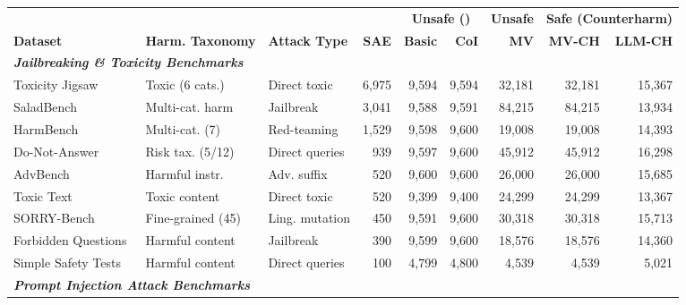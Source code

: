 \begin{table}[t]
\centering
\scriptsize
\setlength{\tabcolsep}{2.5pt}
\begin{tabular}{lll r rr r rr}
\toprule
 & & & & \multicolumn{2}{c}{\textbf{Unsafe (\dllm{})}} & \textbf{Unsafe} & \multicolumn{2}{c}{\textbf{Safe (Counterharm)}} \\
\cmidrule(lr){5-6}\cmidrule(lr){8-9}
\textbf{Dataset} & \textbf{Harm. Taxonomy} & \textbf{Attack Type} & \textbf{SAE} & \textbf{Basic} & \textbf{CoI} & \textbf{MV} & \textbf{MV-CH} & \textbf{LLM-CH} \\
\midrule
\multicolumn{9}{l}{\textbf{\textit{Jailbreaking \& Toxicity Benchmarks}}} \\
Toxicity Jigsaw~\cite{jigsaw2018toxic}                  & Toxic (6 cats.)      & Direct toxic      & 6,975  & 9,594  & 9,594  & 32,181  & 32,181 & 15,367 \\
SaladBench~\cite{li-etal-2024-salad}                    & Multi-cat. harm      & Jailbreak         & 3,041  & 9,588  & 9,591  & 84,215  & 84,215 & 13,934 \\
HarmBench~\cite{mazeika-etal-2024-harmbench}            & Multi-cat. (7)       & Red-teaming       & 1,529  & 9,598  & 9,600  & 19,008  & 19,008 & 14,393 \\
Do-Not-Answer~\cite{wang-etal-2024-answer}              & Risk tax. (5/12)     & Direct queries    & 939    & 9,597  & 9,600  & 45,912  & 45,912 & 16,298 \\
AdvBench~\cite{zou2023universal}                        & Harmful instr.       & Adv. suffix       & 520    & 9,600  & 9,600  & 26,000  & 26,000 & 15,685 \\
Toxic Text~\cite{hada-etal-2021-ruddit}                 & Toxic content        & Direct toxic      & 520    & 9,399  & 9,400  & 24,299  & 24,299 & 13,367 \\
SORRY-Bench~\cite{xie2024sorrybench}                    & Fine-grained (45)    & Ling. mutation    & 450    & 9,591  & 9,600  & 30,318  & 30,318 & 15,713 \\
Forbidden Questions~\cite{shen-etal-2024-doanythingnow} & Harmful content      & Jailbreak         & 390    & 9,599  & 9,600  & 18,576  & 18,576 & 14,360 \\
Simple Safety Tests~\cite{vidgen2024simplesafetytests}  & Harmful content      & Direct queries    & 100    & 4,799  & 4,800  & 4,539   & 4,539  & 5,021 \\
\midrule
\multicolumn{9}{l}{\textbf{\textit{Prompt Injection Attack Benchmarks}}} \\

\end{tabular}
\end{table}
